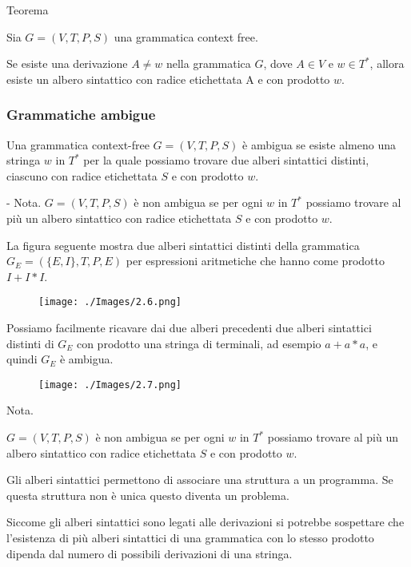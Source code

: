 \vspace{5mm}

Teorema

Sia $G=(V, T, P, S)$ una grammatica context free.

Se esiste una derivazione $A \neq w$ nella grammatica $G$, dove $A \in V$ e $w \in T^{*}$, allora esiste un albero sintattico con radice etichettata A e con prodotto $w$.

\subsubsection{Grammatiche ambigue}

Una grammatica context-free $G=(V, T, P, S)$ è ambigua se esiste almeno una stringa $w$ in $T^{*}$ per la quale possiamo trovare due alberi sintattici distinti, ciascuno con radice etichettata $S$ e con prodotto $w$.

\vspace{5mm}

- Nota. $G=(V, T, P, S)$ è non ambigua se per ogni $w$ in $T^{*}$ possiamo trovare al più un albero sintattico con radice etichettata $S$ e con prodotto $w$.

La figura seguente mostra due alberi sintattici distinti della grammatica $G_{E}=(\{E, I\}, T, P, E)$ per espressioni aritmetiche che hanno come prodotto $I+I * I$.

\begin{figure}[hbpt!]
    \centering
    \texttt{[image: ./Images/2.6.png]}
\end{figure}
\FloatBarrier

Possiamo facilmente ricavare dai due alberi precedenti due alberi sintattici distinti di $G_{E}$ con prodotto una stringa di terminali, ad esempio $a+a * a$, e quindi $G_{E}$ è ambigua.
\begin{figure}[hbpt!]
    \centering
    \texttt{[image: ./Images/2.7.png]}
\end{figure}
\FloatBarrier

Nota. 

$G=(V, T, P, S)$ è non ambigua se per ogni $w$ in $T^{*}$ possiamo trovare al più un albero sintattico con radice etichettata $S$ e con prodotto $w$.

Gli alberi sintattici permettono di associare una struttura a un programma. Se questa struttura non è unica questo diventa un problema.

Siccome gli alberi sintattici sono legati alle derivazioni si potrebbe sospettare che l'esistenza di più alberi sintattici di una grammatica con lo stesso prodotto dipenda dal numero di possibili derivazioni di una stringa.


